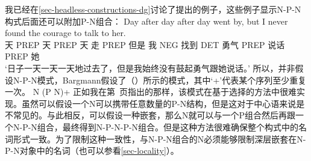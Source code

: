\begin{exe}
\begin{xlist}[iv.]
\begin{exe}
\begin{xlist}[iv.]
我已经在\ref{sec-headless-constructions-dg}讨论了\citet{Bargmann2015a}提出的例子，这些例子显示N-P-N构式后面还可以附加P-N组合：
\ea
\gll Day after day after day went by, but I never found the courage to talk to her.\\
	 天 PREP 天 PREP 天 走 PREP 但是 我 NEG 找到 DET 勇气 PREP 说话 PREP 她\\
\glt `日子一天一天一天地过去了，但是我始终没有鼓起勇气跟她说话。'
\z
所以，并非假设N-P-N模式，Bargmann假设了（）所示的模式，其中`+'\is{$+$}代表某个序列至少重复一次。
\ea
N (P N)+
\z
正如我在第~\pageref{n-p-n-plus-cx}页指出的那样，该模式在基于选择的方法中很难实现。虽然可以假设一个N可以携带任意数量的P-N结构，但是这对于中心语来说是不常见的。与此相反，可以假设一种嵌套，那么N就可以与一个P组合然后再跟一个N-P-N组合，最终得到N-P-N-P-N组合。但是这种方法很难确保整个构式中的名词形式一致。为了限制这种一致性，与N-P-N组合的N必须能够限制深层嵌套在N-P-N对象中的名词（也可以参看\ref{sec-locality}）。


\end{xlist}
\end{exe}
\end{xlist}
\end{exe}
